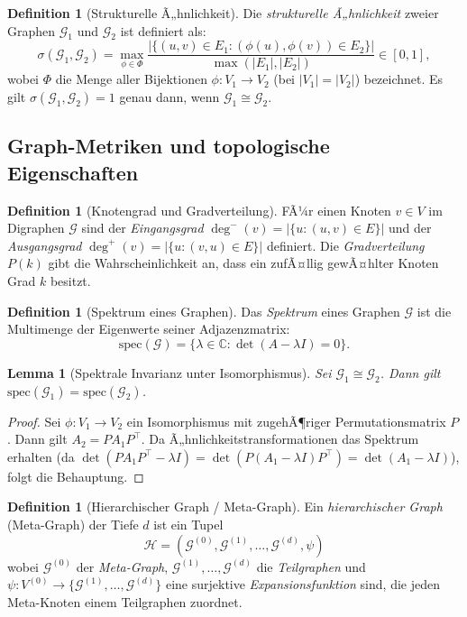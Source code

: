 ﻿\documentclass[12pt,a4paper]{article}
\theoremstyle{plain}
\newtheorem{lemma}[theorem]{Lemma}
\theoremstyle{definition}
\newtheorem{definition}[theorem]{Definition}
\theoremstyle{remark}
\newcommand{\GG}{\mathcal{G}}
\newcommand{\HH}{\mathcal{H}}
\begin{document}
\begin{definition}[Strukturelle Ã„hnlichkeit]
\label{def:aehnlichkeit}
Die \emph{strukturelle Ã„hnlichkeit} zweier Graphen $\GG_1$ und $\GG_2$ ist definiert als:
\[
  \sigma(\GG_1, \GG_2) = \max_{\phi \in \Phi} \frac{\left|\{(u,v) \in E_1 : (\phi(u), \phi(v)) \in E_2\}\right|}{\max(|E_1|, |E_2|)} \in [0,1],
\]
wobei $\Phi$ die Menge aller Bijektionen $\phi: V_1 \to V_2$ (bei $|V_1|=|V_2|$) bezeichnet. Es gilt $\sigma(\GG_1, \GG_2) = 1$ genau dann, wenn $\GG_1 \cong \GG_2$.
\end{definition}

\subsection{Graph-Metriken und topologische Eigenschaften}

\begin{definition}[Knotengrad und Gradverteilung]
\label{def:grad}
FÃ¼r einen Knoten $v \in V$ im Digraphen $\GG$ sind der \emph{Eingangsgrad} $\deg^-(v) = |\{u : (u,v) \in E\}|$ und der \emph{Ausgangsgrad} $\deg^+(v) = |\{u : (v,u) \in E\}|$ definiert. Die \emph{Gradverteilung} $P(k)$ gibt die Wahrscheinlichkeit an, dass ein zufÃ¤llig gewÃ¤hlter Knoten Grad $k$ besitzt.
\end{definition}

\begin{definition}[Spektrum eines Graphen]
\label{def:spektrum}
Das \emph{Spektrum} eines Graphen $\GG$ ist die Multimenge der Eigenwerte seiner Adjazenzmatrix:
\[
  \text{spec}(\GG) = \{\lambda \in \mathbb{C} : \det(A - \lambda I) = 0\}.
\]
\end{definition}

\begin{lemma}[Spektrale Invarianz unter Isomorphismus]
\label{lem:spektrum}
Sei $\GG_1 \cong \GG_2$. Dann gilt $\text{spec}(\GG_1) = \text{spec}(\GG_2)$.
\end{lemma}

\begin{proof}
Sei $\phi: V_1 \to V_2$ ein Isomorphismus mit zugehÃ¶riger Permutationsmatrix $P$. Dann gilt $A_2 = P A_1 P^\top$. Da Ã„hnlichkeitstransformationen das Spektrum erhalten (da $\det(PA_1P^\top - \lambda I) = \det(P(A_1-\lambda I)P^\top) = \det(A_1 - \lambda I)$), folgt die Behauptung.
\end{proof}

\begin{definition}[Hierarchischer Graph / Meta-Graph]
\label{def:metagraph}
Ein \emph{hierarchischer Graph} (Meta-Graph) der Tiefe $d$ ist ein Tupel
\[
  \HH = (\GG^{(0)}, \GG^{(1)}, \ldots, \GG^{(d)}, \psi)
\]
wobei $\GG^{(0)}$ der \emph{Meta-Graph}, $\GG^{(1)}, \ldots, \GG^{(d)}$ die \emph{Teilgraphen} und $\psi: V^{(0)} \to \{\GG^{(1)}, \ldots, \GG^{(d)}\}$ eine surjektive \emph{Expansionsfunktion} sind, die jeden Meta-Knoten einem Teilgraphen zuordnet.
\end{definition}
\end{document}
